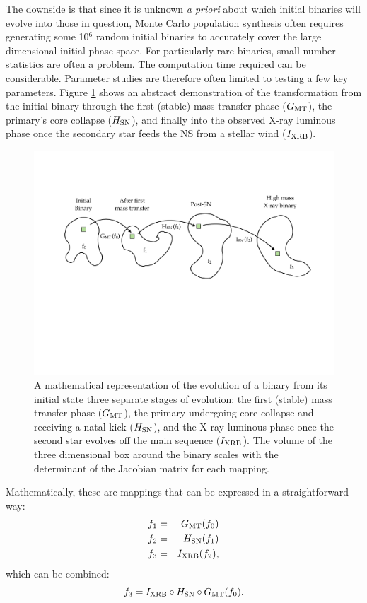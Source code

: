 \documentclass[12pt, preprint]{aastex}
\begin{document}
The downside is that since it is unknown {\it a priori} about which initial binaries will evolve into those in question, Monte Carlo population synthesis often requires generating some 10$^6$ random initial binaries to accurately cover the large dimensional initial phase space. For particularly rare binaries, small number statistics are often a problem. The computation time required can be considerable. Parameter studies are therefore often limited to testing a few key parameters. Figure \ref{fig:Mapping} shows an abstract demonstration of the transformation from the initial binary through the first (stable) mass transfer phase ($G_{\rm MT}$), the primary's core collapse ($H_{\rm SN}$), and finally into the observed X-ray luminous phase once the secondary star feeds the NS from a stellar wind ($I_{\rm XRB}$).

\begin{figure}[h!]
\begin{center}
\includegraphics[width=0.95\columnwidth]{Mapping.pdf}
\caption{A mathematical representation of the evolution of a binary from its initial state three separate stages of evolution: the first (stable) mass transfer phase ($G_{\rm MT}$), the primary undergoing core collapse and receiving a natal kick ($H_{\rm SN}$), and the X-ray luminous phase once the second star evolves off the main sequence ($I_{\rm XRB}$). The volume of the three dimensional box around the binary scales with the determinant of the Jacobian matrix for each mapping.}
\label{fig:Mapping}
\end{center}
\end{figure}

Mathematically, these are mappings that can be expressed in a straightforward way:
\begin{eqnarray}
f_1 &=& G_{\rm MT} (f_0) \\
f_2 &=& H_{\rm SN} (f_1) \\
f_3 &=& I_{\rm XRB} (f_2), \\
\end{eqnarray}
which can be combined:
\begin{equation}
f_3 = I_{\rm XRB} \circ H_{\rm SN} \circ G_{\rm MT} ( f_0).
\end{equation}
\end{document}
